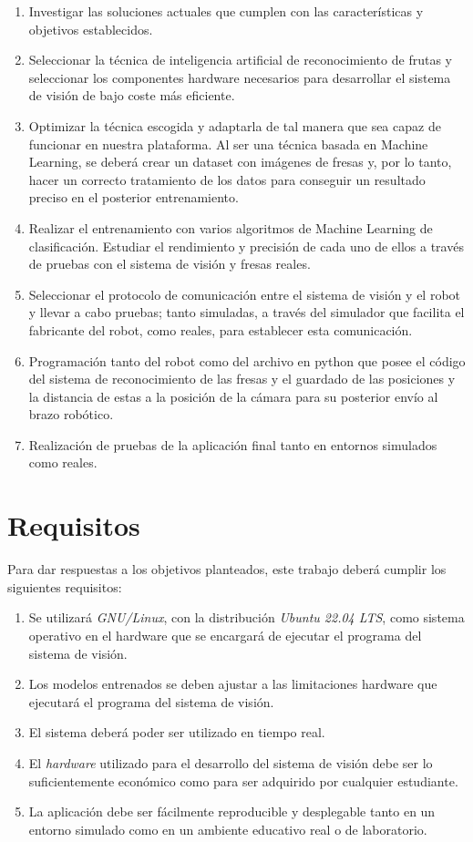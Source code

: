 \begin{enumerate}
  \item Investigar las soluciones actuales que cumplen con las características y objetivos establecidos.
  \item Seleccionar la técnica de inteligencia artificial de reconocimiento de frutas y seleccionar los componentes hardware necesarios para desarrollar el sistema de visión de bajo coste más eficiente.
  \item Optimizar la técnica escogida y adaptarla de tal manera que sea capaz de funcionar en nuestra plataforma. Al ser una técnica basada en Machine Learning, se deberá crear un dataset con imágenes de fresas y, por lo tanto, hacer un correcto tratamiento de los datos para conseguir un resultado preciso en el posterior entrenamiento.
  \item Realizar el entrenamiento con varios algoritmos de Machine Learning de
clasificación. Estudiar el rendimiento y precisión de cada uno de ellos a través de pruebas con el sistema de visión y fresas reales.
  \item Seleccionar el protocolo de comunicación entre el sistema de visión y el robot y llevar a cabo pruebas; tanto simuladas, a través del simulador que facilita el fabricante del robot, como reales, para establecer esta comunicación.
  \item Programación tanto del robot como del archivo en python que posee el código del sistema de reconocimiento de las fresas y el guardado de las posiciones y la distancia de estas a la posición de la cámara para su posterior envío al brazo robótico.
  \item Realización de pruebas de la aplicación final tanto en entornos simulados como reales.
\end{enumerate} 


\section{Requisitos}
\label{sec:requisitos}

Para dar respuestas a los objetivos planteados, este trabajo deberá cumplir los siguientes requisitos:

\begin{enumerate}
  \item Se utilizará \textit{GNU/Linux}, con la distribución \textit{Ubuntu 22.04 LTS}, como sistema operativo en el hardware que se encargará de ejecutar el programa del sistema de visión.
  \item Los modelos entrenados se deben ajustar a las limitaciones hardware que ejecutará el programa del sistema de visión.
  \item El sistema deberá poder ser utilizado en tiempo real. 
  \item El \textit{hardware} utilizado para el desarrollo del sistema de visión debe ser lo suficientemente económico como para ser adquirido por cualquier estudiante.
  \item La aplicación debe ser fácilmente reproducible y desplegable tanto en un entorno simulado como en un ambiente educativo real o de laboratorio.
\end{enumerate}  

